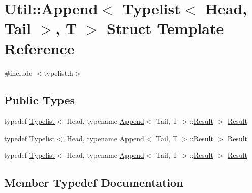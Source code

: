 \hypertarget{structUtil_1_1TL_1_1Append_3_01Typelist_3_01Head_00_01Tail_01_4_00_01T_01_4}{}\section{Util\+:\+:Append$<$ Typelist$<$ Head, Tail $>$, T $>$ Struct Template Reference}
\label{structUtil_1_1TL_1_1Append_3_01Typelist_3_01Head_00_01Tail_01_4_00_01T_01_4}


{\ttfamily \#include $<$typelist.\+h$>$}

\subsection*{Public Types}
\begin{DoxyCompactItemize}
\item 
typedef \mbox{\hyperlink{structUtil_1_1Typelist}{Typelist}}$<$ Head, typename \mbox{\hyperlink{structUtil_1_1TL_1_1Append}{Append}}$<$ Tail, T $>$\+::\mbox{\hyperlink{structUtil_1_1TL_1_1Append_3_01Typelist_3_01Head_00_01Tail_01_4_00_01T_01_4_ae4e9d942296ff4d7021b2482ec712082}{Result}} $>$ \mbox{\hyperlink{structUtil_1_1TL_1_1Append_3_01Typelist_3_01Head_00_01Tail_01_4_00_01T_01_4_ae4e9d942296ff4d7021b2482ec712082}{Result}}
\item 
typedef \mbox{\hyperlink{structUtil_1_1Typelist}{Typelist}}$<$ Head, typename \mbox{\hyperlink{structUtil_1_1TL_1_1Append}{Append}}$<$ Tail, T $>$\+::\mbox{\hyperlink{structUtil_1_1TL_1_1Append_3_01Typelist_3_01Head_00_01Tail_01_4_00_01T_01_4_ae4e9d942296ff4d7021b2482ec712082}{Result}} $>$ \mbox{\hyperlink{structUtil_1_1TL_1_1Append_3_01Typelist_3_01Head_00_01Tail_01_4_00_01T_01_4_ae4e9d942296ff4d7021b2482ec712082}{Result}}
\item 
typedef \mbox{\hyperlink{structUtil_1_1Typelist}{Typelist}}$<$ Head, typename \mbox{\hyperlink{structUtil_1_1TL_1_1Append}{Append}}$<$ Tail, T $>$\+::\mbox{\hyperlink{structUtil_1_1TL_1_1Append_3_01Typelist_3_01Head_00_01Tail_01_4_00_01T_01_4_ae4e9d942296ff4d7021b2482ec712082}{Result}} $>$ \mbox{\hyperlink{structUtil_1_1TL_1_1Append_3_01Typelist_3_01Head_00_01Tail_01_4_00_01T_01_4_ae4e9d942296ff4d7021b2482ec712082}{Result}}
\end{DoxyCompactItemize}


\subsection{Member Typedef Documentation}
\mbox{\label{structUtil_1_1TL_1_1Append_3_01Typelist_3_01Head_00_01Tail_01_4_00_01T_01_4_ae4e9d942296ff4d7021b2482ec712082}} 
